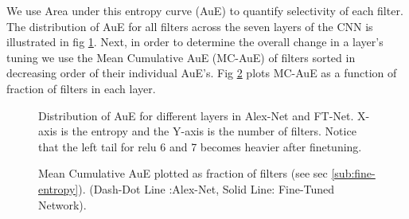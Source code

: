 \documentclass[runningheads]{llncs}
\begin{document}
We use Area under this entropy curve (AuE) to quantify selectivity of each filter. The distribution of AuE for all filters across the seven layers of the CNN is illustrated in fig \ref{fig:fine-hist}. Next, in order to determine the overall change in a layer's tuning we use the Mean Cumulative AuE (MC-AuE) of filters sorted in decreasing order of their individual AuE's. Fig \ref{fig:fine-entropy} plots MC-AuE as a function of fraction of filters in each layer. 

\begin{figure}[H]
\centering
{}
\caption{Distribution of AuE for different layers in Alex-Net and FT-Net. X-axis is the entropy and the Y-axis is the number of filters. Notice that the left tail for relu 6 and 7 becomes heavier after finetuning.}
\label{fig:fine-hist}
\end{figure}

\begin{figure}
\centering
{}
\caption{Mean Cumulative AuE plotted as fraction of filters (see sec \ref{sub:fine-entropy}). (Dash-Dot Line :Alex-Net, Solid Line: Fine-Tuned Network).}
\label{fig:fine-entropy}
\end{figure}
\end{document}
